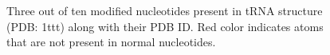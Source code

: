 \documentclass[12pt]{article}
\begin{document}
\begin{figure}[h!]
\centering
\begin{center}
\end{center}
\caption{Three out of ten modified nucleotides present in tRNA structure (PDB: 1ttt) along with their PDB ID. Red color indicates atoms that are not present in normal nucleotides. }
\label{ModifiedNucleotides}
\end{figure}
\end{document}
